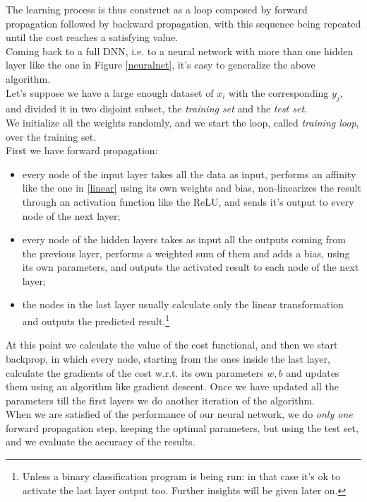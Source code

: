 \documentclass[12pt, a4paper]{report}
\theoremstyle{definition}
\begin{document}
The learning process is thus construct as a loop composed by forward propagation followed by backward propagation, with this sequence being repeated until the cost reaches a satisfying value.\\
Coming back to a full DNN, i.e. to a neural network with more than one hidden layer like the one in Figure \ref{neuralnet}, it's easy to generalize the above algorithm.\\
Let's suppose we have a large enough dataset of $x_i$ with the corresponding $y_j$, and divided it in two disjoint subset, the \textit{training set} and the \textit{test set}.\\
We initialize all the weights randomly, and we start the loop, called \textit{training loop}, over the training set.\\
First we have forward propagation:
\begin{itemize}
\item every node of the input layer takes all the data as input, performs an affinity like the one in \eqref{linear} using its own weights and bias, non-linearizes the result through an activation function like the ReLU, and sends it's output to every node of the next layer;
\item every node of the hidden layers takes as input all the outputs coming from the previous layer, performs a weighted sum of them and adds a bias, using its own parameters, and outputs the activated result to each node of the next layer;
\item the nodes in the last layer usually calculate only the linear transformation and outputs the predicted result.\footnote{Unless a binary classification program is being run: in that case it's ok to activate the last layer output too. Further insights will be given later on.}
\end{itemize}
At this point we calculate the value of the cost functional, and then we start backprop, in which every node, starting from the ones inside the last layer, calculate the gradients of the cost w.r.t. its own parameters $w,b$ and updates them using an algorithm like gradient descent. Once we have updated all the parameters till the first layers we do another iteration of the algorithm.\\
When we are satisfied of the performance of our neural network, we do \textit{only one} forward propagation step, keeping the optimal parameters, but using the test set, and we evaluate the accuracy of the results.\\
\newline
\end{document}
